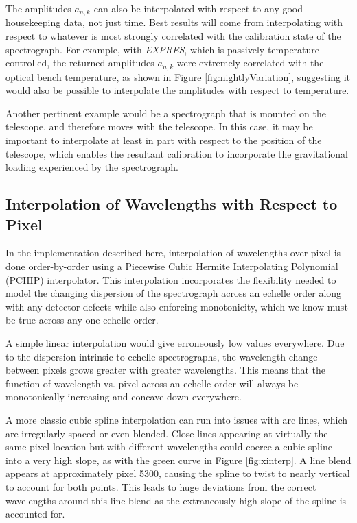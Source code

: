 \documentclass[modern]{aastex63}
\newcommand{\project}[1]{\textsl{#1}}
\newcommand{\acronym}[1]{{\small{#1}}}
\newcommand{\expres}{\project{\acronym{EXPRES}}}
\begin{document}
The amplitudes $a_{n,k}$ can also be interpolated with respect to any good housekeeping data, not just time.  Best results will come from interpolating with respect to whatever is most strongly correlated with the calibration state of the spectrograph.  For example, with \expres, which is passively temperature controlled, the returned amplitudes $a_{n,k}$ were extremely correlated with the optical bench temperature, as shown in Figure \ref{fig:nightlyVariation}, suggesting it would also be possible to interpolate the amplitudes with respect to temperature.

Another pertinent example would be a spectrograph that is mounted on the telescope, and therefore moves with the telescope.  In this case, it may be important to interpolate at least in part with respect to the position of the telescope, which enables the resultant calibration to incorporate the gravitational loading experienced by the spectrograph.


\subsection{Interpolation of Wavelengths with Respect to Pixel}
\label{sec:choice_wvp}
In the implementation described here, interpolation of wavelengths over pixel  is done order-by-order using a Piecewise Cubic Hermite Interpolating Polynomial (PCHIP) interpolator.  This interpolation incorporates the flexibility needed to model the changing dispersion of the spectrograph across an echelle order along with any detector defects while also enforcing monotonicity, which we know must be true across any one echelle order.

A simple linear interpolation would give erroneously low values everywhere.  Due to the dispersion intrinsic to echelle spectrographs, the wavelength change between pixels grows greater with greater wavelengths.  This means that the function of wavelength vs. pixel across an echelle order will always be monotonically increasing and concave down everywhere.

A more classic cubic spline interpolation can run into issues with arc lines, which are irregularly spaced or even blended.  Close lines appearing at virtually the same pixel location but with different wavelengths could coerce a cubic spline into a very high slope, as with the green curve in Figure \ref{fig:xinterp}.  A line blend appears at approximately pixel 5300, causing the spline to twist to nearly vertical to account for both points.  This leads to huge deviations from the correct wavelengths around this line blend as the extraneously high slope of the spline is accounted for.
\end{document}
